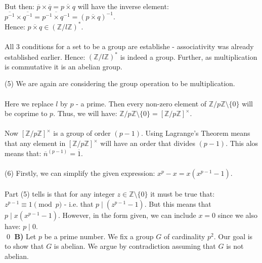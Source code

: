 \documentclass[12pt,a4paper]{article}
\begin{document}
But then: $\overline{p} \times \overline{q} = \overline{p \times q}$ will have the inverse element: $\overline{p^{-1}} \times \overline{q^{-1}} = \overline{p^{-1} \times q^{-1}} = (\overline{p \times q})^{-1}$.\\
Hence: $\overline{p \times q} \in (\mathbb{Z} / l\mathbb{Z})^*$.\\
\\
All 3 conditions for a set to be a group are establishe - associativity was already established earlier.  Hence: $(\mathbb{Z} / l\mathbb{Z})^*$ is indeed a group.
Further, as multiplication is commutative it is an abelian group.

\newpage
\noindent
(5)
We are again are considering the group operation to be multiplication.\\
\\
Here we replace $l$ by $p$ - a prime.  Then every non-zero element of $\mathbb{Z} / p\mathbb{Z} \setminus \{0\}$ will be coprime to $p$.
Thus, we will have: $\mathbb{Z} / p\mathbb{Z} \setminus \{0\} = [\mathbb{Z} / p\mathbb{Z}]^{\times}$.\\
\\
Now $[\mathbb{Z} / p\mathbb{Z}]^{\times}$ is a group of order $(p-1)$.  Using Lagrange's Theorem means that any element in $[\mathbb{Z} / p\mathbb{Z}]^{\times}$ will have an order that divides $(p-1)$.
This alos means that: $\overline{n}^{(p-1)} = \overline{1}$.\\
\\
(6) Firstly, we can simplify the given expression: $x^p - x = x(x^{p-1} - 1)$.\\
\\
Part (5) tells is that for any integer $z \in \mathbb{Z} \setminus \{0\}$ it must be true that: $z^{p-1} \equiv 1 \pmod{p}$ - i.e. that $p \; | \; (z^{p-1} - 1)$.  But this means that $p \; | \; x(x^{p-1} - 1)$.
However, in the form given, we can include $x=0$ since we also have: $p \; | \; 0$.\\
\qed
\newpage
\noindent\textbf{B)} Let $p$ be a prime number. We fix a group $G$ of cardinality $p^2$. Our goal is to show that $G$ is abelian. We argue by contradiction assuming that $G$ is not abelian.
\end{document}
